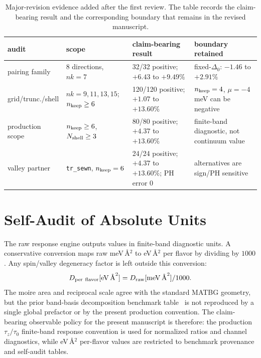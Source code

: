 \documentclass[aps,prb,reprint,superscriptaddress,floatfix,nofootinbib]{revtex4-2}
\begin{document}
\begin{table}[t]
\caption{Major-revision evidence added after the first review.  The table
records the claim-bearing result and the corresponding boundary that remains
in the revised manuscript.}
\label{tab:major_revision_evidence}
\small
\begin{ruledtabular}
\begin{tabular}{p{}p{}p{}p{}}
audit & scope & claim-bearing result & boundary retained\\
\hline
pairing family & 8 directions, $nk=7$ & 32/32 positive; $+6.43$ to $+9.49\%$ & fixed-$\Delta_0$: $-1.46$ to $+2.91\%$\\
grid/trunc./shell & $nk=9,11,13,15$; $n_{\rm keep}\ge6$ & 120/120 positive; $+1.07$ to $+13.60\%$ & $n_{\rm keep}=4$, $\mu=-4$ meV can be negative\\
production scope & $n_{\rm keep}\ge6$, $N_{\rm shell}\ge3$ & 80/80 positive; $+4.37$ to $+13.60\%$ & finite-band diagnostic, not continuum value\\
valley partner & \texttt{tr\_sewn}, $n_{\rm keep}=6$ & 24/24 positive; $+4.37$ to $+13.60\%$; PH error $0$ & alternatives are sign/PH sensitive\\
\end{tabular}
\end{ruledtabular}
\end{table}

\section{Self-Audit of Absolute Units}

The raw response engine outputs values in finite-band diagnostic units.
A conservative conversion maps raw meV\,\AA$^2$ to eV\,\AA$^2$ per flavor by
dividing by $1000$.
Any spin/valley degeneracy factor is left outside this conversion:
\begin{equation}
  D_{\rm per~flavor}[\mathrm{eV}\,\text{\AA}^2]
  =
  D_{\rm raw}[\mathrm{meV}\,\text{\AA}^2]/1000.
\end{equation}
The moire area and reciprocal scale agree with the standard MATBG geometry,
but the prior band-basis decomposition benchmark table~\cite{zhou_decomposition_2026}
is not reproduced by a single global prefactor or by the present production
convention.
The claim-bearing observable policy for the present manuscript is therefore:
the production $\tau_z/\tau_0$ finite-band response convention is used for
normalized ratios and channel diagnostics, while eV\,\AA$^2$ per-flavor values
are restricted to benchmark provenance and self-audit tables.
\end{document}
